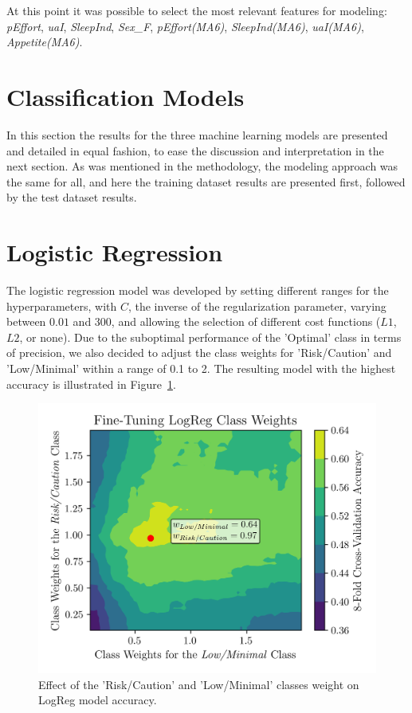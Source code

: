 \documentclass[conference]{IEEEtran}
\begin{document}
At this point it was possible to select the most relevant features for modeling: \textit{pEffort}, \textit{uaI}, \textit{SleepInd}, \textit{Sex\_F}, \textit{pEffort(MA6)}, \textit{SleepInd(MA6)}, \textit{uaI(MA6)}, \textit{Appetite(MA6)}.

\section{Classification Models}

In this section the results for the three machine learning models are presented and detailed in equal fashion, to ease the discussion and interpretation in the next section. As was mentioned in the methodology, the modeling approach was the same for all, and here the training dataset results are presented first, followed by the test dataset results.

\section{Logistic Regression}

The logistic regression model was developed by setting different ranges for the hyperparameters, with $C$, the inverse of the regularization parameter, varying between $0.01$ and $300$, and allowing the selection of different cost functions ($L1$, $L2$, or none). Due to the suboptimal performance of the 'Optimal' class in terms of precision, we also decided to adjust the class weights for 'Risk/Caution' and 'Low/Minimal' within a range of 0.1 to 2. The resulting model with the highest accuracy is illustrated in Figure~\ref{logregWt}.

\begin{figure}[H]
    \centering
    \includegraphics[width=1\linewidth]{assets/LOGR_class_weights.png}
    \caption{Effect of the 'Risk/Caution' and 'Low/Minimal' classes weight on LogReg model accuracy.}
    \label{logregWt}
\end{figure} %
\end{document}
